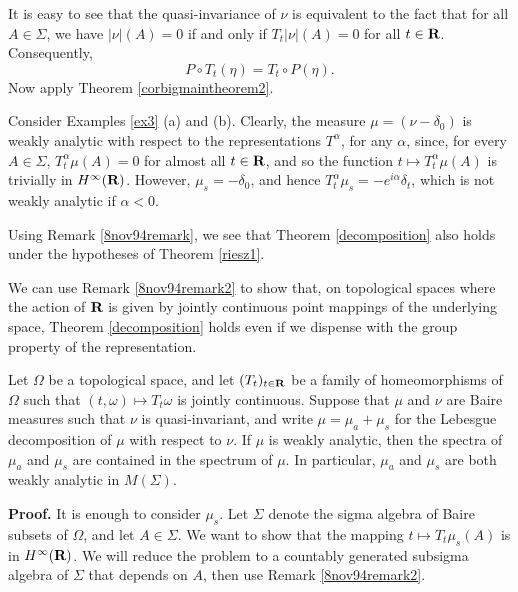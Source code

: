 It is easy to see that the quasi-invariance of
$\nu$ is equivalent to the fact that for all
 $A\in \Sigma$, we have $|\nu|(A)=0$ if and
only if $T_t|\nu|(A)=0$ for all $t\in\R$.  Consequently, 
$$P\circ T_t(\eta)=T_t\circ P(\eta).$$
Now
apply Theorem \ref{corbigmaintheorem2}.
\begin{notstronganalytic}
{\rm Consider Examples \ref{ex3} (a) and (b).  
Clearly, the measure $\mu = (\nu -\delta_0)$ 
is weakly analytic with respect to the 
representations $T^\alpha$, for any $\alpha$, 
since, for every $A\in \Sigma$, 
$T_t^{\alpha} \mu (A)=0$ for almost 
all $t\in \R$, and so the
function $t\mapsto T^\alpha_t\mu(A)$
is trivially in $H^\infty(\R)$.  
However, $\mu_s = -\delta_0$, and hence
$T_t^\alpha \mu_s = -e^{i\alpha} \delta_t$, which is not 
weakly analytic if $\alpha < 0$.}
\label{notstronganalytic}
\end{notstronganalytic}
\begin{8nov94remark2}
{\rm Using 
Remark \ref{8nov94remark}, we see that
Theorem \ref{decomposition} also holds under the hypotheses 
of Theorem \ref{riesz1}. 
}
\label{8nov94remark2}
\end{8nov94remark2}
We can use Remark \ref{8nov94remark2} to show that, on topological
spaces where the action of $\R$ is given by 
jointly continuous point mappings of the underlying
space,
Theorem \ref{decomposition} holds even if we dispense with the group
property of the representation.
\begin{fandmriesz2}
Let $\Omega$ be a topological space, and let $(T_t)_{t\in\R}$ be 
a family of homeomorphisms of $\Omega$ such that 
$(t, \omega)\mapsto T_t\omega$ is jointly continuous. 
Suppose that $\mu$ and $\nu$ are Baire measures
such that $\nu$ is quasi-invariant, and write $\mu=\mu_a+\mu_s$
for the Lebesgue decomposition of $\mu$ with respect to $\nu$.
If $\mu$ is weakly analytic, then the spectra of $\mu_a$ and $\mu_s$
are contained in the spectrum of $\mu$.  In particular, $\mu_a$ and 
$\mu_s$ are both
weakly analytic in $M(\Sigma)$.
\label{fandmriesz2}
\end{fandmriesz2}
{\bf Proof.}  It is enough to consider
$\mu_s$.  Let $\Sigma$ denote the sigma algebra of 
Baire subsets of $\Omega$, and let $A\in \Sigma$.
We want to show that the 
mapping $t\mapsto T_t\mu_s(A)$ is in $H^\infty(\R)$.
We will reduce the problem to a countably generated
subsigma algebra of $\Sigma$ that depends
on $A$, then use Remark \ref{8nov94remark2}.

